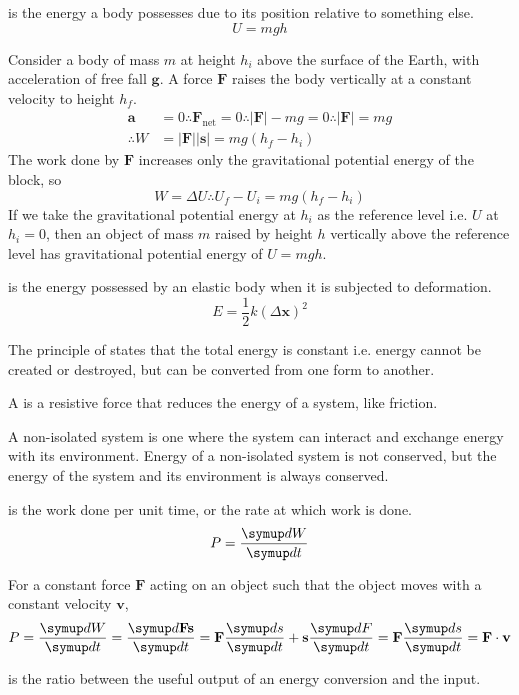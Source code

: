 \documentclass[Physics.tex]{subfiles}
\begin{document}
 is the energy a body possesses due to its position relative to something else. \begin{equation}U = mgh\end{equation}

\begin{slderiv}Consider a body of mass \(m\) at height \(h_i\) above the surface of the Earth, with acceleration of free fall \(\mathbf{g}\). A force \(\mathbf{F}\) raises the body vertically at a constant velocity to height \(h_f\). \[\begin{split}\mathbf{a} &= 0 \mathrel\therefore \mathbf{F}_\text{net} = 0 \mathrel\therefore \left|\mathbf{F}\right| - mg = 0 \mathrel\therefore \left|\mathbf{F}\right| = mg\\\mathrel\therefore W &= \left|\mathbf{F}\right|\left|\mathbf{s}\right| = mg(h_f - h_i)\end{split}\] The work done by \(\mathbf{F}\) increases only the gravitational potential energy of the block, so \[W = \Delta U \mathrel\therefore U_{f} - U_{i} = mg(h_f - h_i)\] If we take the gravitational potential energy at \(h_i\) as the reference level i.e. \(U\) at \(h_i = 0\), then an object of mass \(m\) raised by height \(h\) vertically above the reference level has gravitational potential energy of \(U = mgh\).\qedhere\end{slderiv}

 is the energy possessed by an elastic body when it is subjected to deformation. \begin{equation}E = \frac{1}{2}k(\Delta\mathbf{x})^2\end{equation}

The principle of  states that the total energy is constant i.e. energy cannot be created or destroyed, but can be converted from one form to another.

A  is a resistive force that reduces the energy of a system, like friction.

A non-isolated system is one where the system can interact and exchange energy with its environment. Energy of a non-isolated system is not conserved, but the energy of the system and its environment is always conserved.

 is the work done per unit time, or the rate at which work is done. \begin{equation}P = \sldd{W}{t}\end{equation}

For a constant force \(\mathbf{F}\) acting on an object such that the object moves with a constant velocity \(\mathbf{v}\), \begin{equation}P = \sldd{W}{t} = \sldd{\mathbf{Fs}}{t} = \mathbf{F}\sldd{s}{t} + \mathbf{s}\sldd{F}{t} = \mathbf{F}\sldd{s}{t} = \mathbf{F}\cdot\mathbf{v}\end{equation}

 is the ratio between the useful output of an energy conversion and the input.
\end{document}
